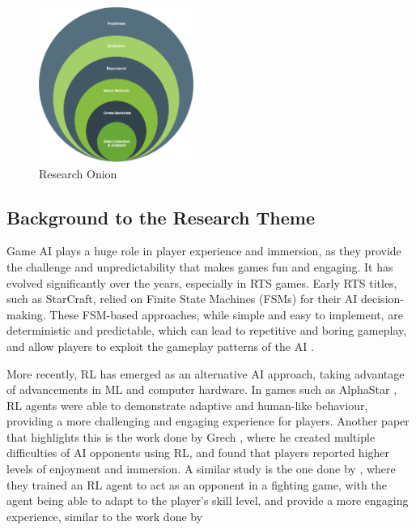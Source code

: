 \documentclass[conference]{IEEEtran}
\begin{document}
\begin{figure}[htbp]
	\centering
	\includegraphics[width=0.45\textwidth]{Images/Research_Onion.PNG}
	\caption{Research Onion}
	\label{fig:research_onion}
\end{figure}


\subsection{Background to the Research Theme}

Game AI plays a huge role in player experience and immersion, as they provide the challenge and unpredictability that makes games fun and engaging.
It has evolved significantly over the years, especially in RTS games. Early RTS titles, such as StarCraft, relied on Finite State Machines (FSMs) for their AI decision-making. These FSM-based approaches,
while simple and easy to implement, are deterministic and predictable, which can lead to repetitive and boring gameplay, and allow players to exploit the gameplay patterns of the AI \cite{noauthor_finite_2020} 
\cite{jagdale_finite_2021}.


More recently, RL has emerged as an alternative AI approach, taking advantage of advancements in ML and computer hardware. In games such as AlphaStar \cite{vinyals_grandmaster_2019}, RL agents were able to
demonstrate adaptive and human-like behaviour, providing a more challenging and engaging experience for players. Another paper that highlights this is the work done by Grech \cite{grech_creating_2023},
where he created multiple difficulties of AI opponents using RL, and found that players reported higher levels of enjoyment and immersion. A similar study is the one done by \cite{bin_ramlan_implementation_2021},
where they trained an RL agent to act as an opponent in a fighting game, with the agent being able to adapt to the player's skill level, and provide a more engaging experience, similar to the work done by \cite{vinyals_grandmaster_2019}
\end{document}
